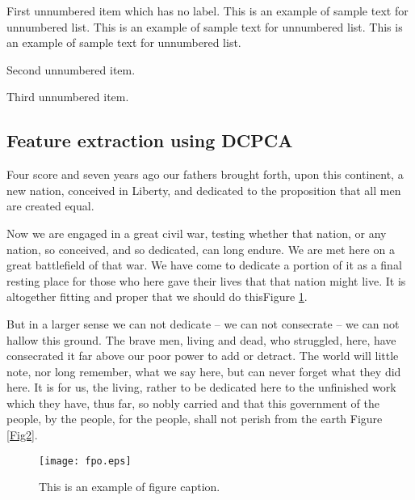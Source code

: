 \documentclass{pasa}%
\begin{document}
\begin{unnumlist}
  \item First unnumbered item which has no label. This is an example
  of sample text for unnumbered list. This is an example
  of sample text for unnumbered list. This is an example
  of sample text for unnumbered list.
  \item Second unnumbered item.
  \item Third unnumbered item.
\end{unnumlist}


\subsection{Feature extraction using DCPCA}

Four score and seven years ago our fathers brought forth, upon this continent, a new nation, conceived in Liberty, and dedicated to the proposition that all men are created equal.

 

Now we are engaged in a great civil war, testing whether that nation, or any nation, so conceived, and so dedicated, can long endure. We are met here on a great battlefield of that war. We have come to dedicate a portion of it as a final resting place for those who here gave their lives that that nation might live. It is altogether fitting and proper that we should do this\break Figure \ref{Fig1}.

 
But in a larger sense we can not dedicate -- we can not consecrate -- we can not hallow this ground. The brave men, living and dead, who struggled, here, have consecrated it far above our poor power to add or detract. The world will little note, nor long remember, what we say here, but can never forget what they did here. It is for us, the living, rather to be dedicated here to the unfinished work which they have, thus far, so nobly carried  and that this government of the people, by the people, for the people, shall not perish from the earth Figure \ref{Fig2}.


\begin{figure}
\begin{center}
\texttt{[image: fpo.eps]}
\caption{This is an example of figure caption.}\label{Fig1}
\end{center}
\end{figure}
\end{document}
